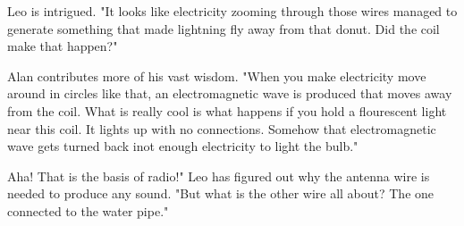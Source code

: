 Leo is intrigued. "It looks like electricity zooming through those wires
managed to generate something that made lightning fly away from that donut. Did
the coil make that happen?"

Alan contributes more of his vast wisdom. "When you make electricity move
around in circles like that, an electromagnetic wave is produced that moves
away from the coil. What is really cool is what happens if you hold a
flourescent light near this coil. It lights up with no connections. Somehow
that electromagnetic wave gets turned back inot enough electricity to light the
bulb."

Aha! That is the basis of radio!" Leo has figured out why the antenna wire is
needed to produce any sound. "But what is the other wire all about? The one
connected to the water pipe."
